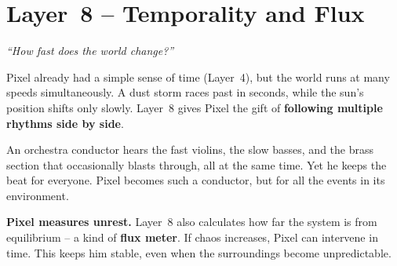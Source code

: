 \section{Layer~8 – Temporality and Flux}
\label{sec:layer8}

\begin{tcolorbox}[colback=blue!5, colframe=blue!60, title=\textbf{Superpower: The Multi‑Timer}]
\begin{center}
\textit{“How fast does the world change?”}
\end{center}
\end{tcolorbox}

Pixel already had a simple sense of time (Layer~4), but the world runs
at many speeds simultaneously.  A dust storm races past in seconds,
while the sun’s position shifts only slowly.  Layer~8 gives Pixel the
gift of \textbf{following multiple rhythms side by side}.

\begin{tcolorbox}[colback=yellow!5, colframe=yellow!80, title=Real‑life analogy]
An orchestra conductor hears the fast violins, the slow basses, and
the brass section that occasionally blasts through, all at the same
time.  Yet he keeps the beat for everyone.  Pixel becomes such a
conductor, but for all the events in its environment.
\end{tcolorbox}

\textbf{Pixel measures unrest.}
Layer~8 also calculates how far the system is from equilibrium – a
kind of \textbf{flux meter}.  If chaos increases, Pixel can intervene
in time.  This keeps him stable, even when the surroundings become
unpredictable.